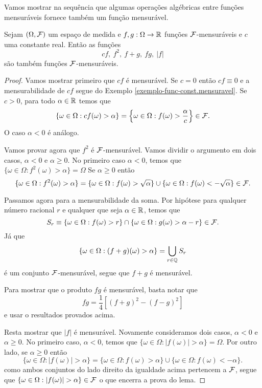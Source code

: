 Vamos mostrar na sequência que algumas operações algébricas
entre funções mensuráveis fornece também um função mensurável.

\begin{lema}\label{lema-operacoes-alg-com-func-mensuraveis}
	Sejam $(\Omega,\mathcal{F})$ um espaço de medida e 
	$f,g:\Omega\to\mathbb{R}$ funções $\mathcal{F}$-mensuráveis 
	e $c$ uma constante real. Então as funções 
	\[
		cf,\ f^2,\ f+g,\ fg,\ |f|
	\]
 	são também funções $\mathcal{F}$-mensuráveis.
\end{lema} 


\begin{proof}
Vamos mostrar primeiro que $cf$ é mensurável. 
Se $c=0$ então $cf\equiv 0$ e a mensurabilidade de $cf$
segue do Exemplo \ref{exemplo-func-const.mensuravel}.
Se $c>0$, para todo $\alpha\in\mathbb{R}$ temos que
\[ 
	\{ \omega\in \Omega: cf(\omega)>\alpha\}
	=
	\left\{ \omega\in \Omega: f(\omega)>\frac{\alpha}{c} \right\}
	\in \mathcal{F}.
\]
O caso $\alpha<0$ é análogo.

Vamos provar agora que $f^2$ é $\mathcal{F}$-mensurável. 
Vamos dividir o argumento em 
dois casos, $\alpha<0$ e $\alpha \geq 0$.
No primeiro caso $\alpha<0$, temos que 
$\{ \omega\in \Omega: f^2(\omega)>\alpha\} = \Omega$
Se $\alpha\geq 0$ então 
\[ 
	\{ \omega\in \Omega: f^2(\omega)>\alpha\} 
	=
	\{ \omega\in \Omega: f(\omega)>\sqrt{\alpha}\} 
	\cup
	\{ \omega\in \Omega: f(\omega)<-\sqrt{\alpha}\}
	\in 
	\mathcal{F}. 
\]

Passamos agora para a mensurabilidade da soma. 
Por hipótese para qualquer número racional $r$
e qualquer que seja $\alpha\in\mathbb{R}$, temos que 
\[
	S_r
	\equiv 
	\{ \omega\in\Omega: f(\omega)>r \} 
		\cap 
		\{ \omega\in\Omega: g(\omega)>\alpha-r \}
	\in 
	\mathcal{F}.
\]
Já que 
\[
	\{ \omega\in\Omega: (f+g)(\omega)>\alpha \}
	=
	\bigcup_{r\in \mathbb{Q}} S_r
\]
é um conjunto $\mathcal{F}$-mensurável, segue que $f+g$ é mensurável.

Para mostrar que o produto $fg$ é mensurável, basta 
notar que 
\[ fg = \frac{1}{4}[(f+g)^2-(f-g)^2] \]
e usar o resultados provados acima.

Resta mostrar que $|f|$ é mensurável.
Novamente consideramos dois casos, $\alpha<0$ e 
$\alpha\geq 0$. No primeiro caso, $\alpha<0$, temos que 
$\{\omega\in\Omega: |f(\omega)|>\alpha\} = \Omega$.
Por outro lado, se $\alpha\geq 0$ então 
\[ 
	\{\omega\in\Omega: |f(\omega)|>\alpha\} 
	= 
	\{\omega\in\Omega: f(\omega)>\alpha\} 
	\cup
	\{\omega\in\Omega: f(\omega)<-\alpha\} .
\]
como ambos conjuntos do lado direito da igualdade 
acima pertencem a $\mathcal{F}$, segue que 
$\{\omega\in\Omega: |f(\omega)|>\alpha\} \in \F$ o que 
encerra a prova do lema.
\end{proof}


